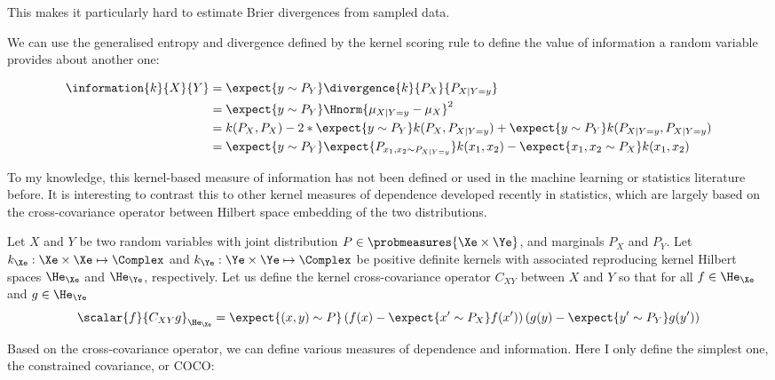  This makes it particularly hard to estimate Brier divergences from sampled data.


We can use the generalised entropy and divergence defined by the kernel scoring rule to define the value of information a random variable provides about another one:

\begin{align}
	\information{k}{X}{Y} &= \expect{y\sim P_{Y}} \divergence{k}{P_{X}}{P_{X\vert Y=y}}\\
		&=  \expect{y\sim P_{Y}} \Hnorm{ \mu_{X \vert Y=y} - \mu_X }^2 \label{eqn:kernel_information}\\
		&= k(P_{X},P_{X}) - 2*\expect{y\sim P_{Y}}k(P_{X},P_{X\vert Y=y}) + \expect{y\sim P_{Y}} k(P_{X\vert Y=y},P_{X\vert Y=y})\\
		&= \expect{y\sim P_{Y}} \expect{P_{x_1,x_2 \sim P_{X\vert Y=y}}}k(x_1,x_2) - \expect{x_1,x_2\sim P_{X}}k(x_1,x_2)
\end{align}

To my knowledge, this kernel-based measure of information has not been defined or used in the machine learning or statistics literature before. It is interesting to contrast this to other kernel measures of dependence developed recently in statistics, which are largely based on the cross-covariance operator between Hilbert space embedding of the two distributions.

\begin{definition}
	Let $X$ and $Y$ be two random variables with joint distribution $P\in\probmeasures{\Xe\times\Ye}$, and marginals $P_X$ and $P_Y$. Let $k_{\Xe}:\Xe\times\Xe\mapsto\Complex$ and $k_{\Ye}:\Ye\times\Ye\mapsto\Complex$ be positive definite kernels with associated reproducing kernel Hilbert spaces $\He_\Xe$ and $\He_\Ye$, respectively. Let us define the kernel cross-covariance operator $C_{XY}$ between $X$ and $Y$ so that for all $f\in\He_\Xe$ and $g\in\He_\Ye$
	\begin{equation}
		\scalar{f}{C_{XY}g}_{\He_\Xe} = \expect{(x,y) \sim P} \left( f(x) - \expect{x'\sim P_X} f(x')\right) \left( g(y) - \expect{y' \sim P_Y} g(y')\right)
	\end{equation}
\end{definition}

Based on the cross-covariance operator, we can define various measures of dependence and information. Here I only define the simplest one, the constrained covariance, or COCO:

